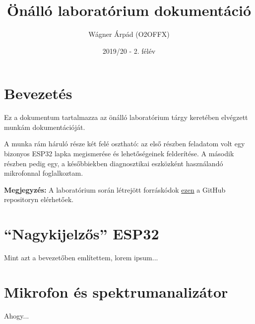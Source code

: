 \documentclass[12pt,a4paper]{article}
\title{Önálló laboratórium dokumentáció}
\author{Wágner Árpád (O2OFFX)}
\date{2019/20 - 2. félév}
\begin{document}
  \maketitle

  \section{Bevezetés}
    Ez a dokumentum tartalmazza az önálló laboratórium tárgy keretében elvégzett munkám dokumentációját.

    A munka rám háruló része két felé osztható: az első részben feladatom volt egy bizonyos ESP32 lapka megismerése és lehetőségeinek felderítése. A második részben pedig egy, a későbbiekben diagnosztikai eszközként használandó mikrofonnal foglalkoztam.

    \textbf{Megjegyzés:} A laboratórium során létrejött forráskódok \href{https://github.com/awrpad/Onlab}{ezen} a GitHub repositoryn elérhetőek.

  \newpage

  \section{``Nagykijelzős'' ESP32}
    Mint azt a bevezetőben említettem, lorem ipsum...

  \section{Mikrofon és spektrumanalizátor}
    Ahogy...
\end{document}
